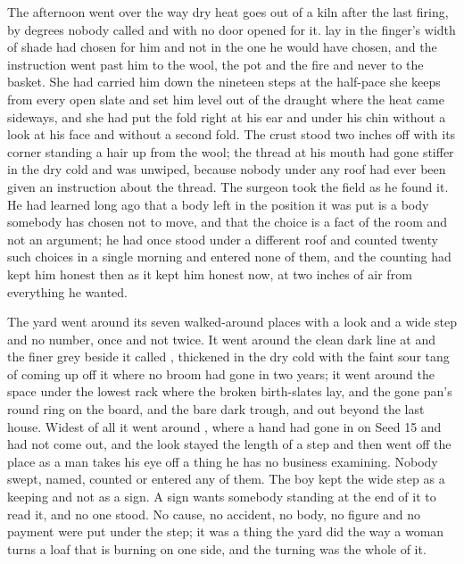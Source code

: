 The afternoon went over  the way dry heat goes out of a kiln after the last firing, by degrees nobody called and with no door opened for it.  lay in the finger's width of shade  had chosen for him and not in the one he would have chosen, and the instruction went past him to the wool, the pot and the fire and never to the basket. She had carried him down the nineteen steps at the half-pace she keeps from every open slate and set him level out of the draught where the heat came sideways, and she had put the fold right at his ear and under his chin without a look at his face and without a second fold. The crust stood two inches off with its corner standing a hair up from the wool; the thread at his mouth had gone stiffer in the dry cold and was unwiped, because nobody under any roof had ever been given an instruction about the thread. The surgeon took the field as he found it. He had learned long ago that a body left in the position it was put is a body somebody has chosen not to move, and that the choice is a fact of the room and not an argument; he had once stood under a different roof and counted twenty such choices in a single morning and entered none of them, and the counting had kept him honest then as it kept him honest now, at two inches of air from everything he wanted.

The yard went around its seven walked-around places with a look and a wide step and no number, once and not twice. It went around the clean dark line at  and the finer grey beside it called , thickened in the dry cold with the faint sour tang of  coming up off it where no broom had gone in two years; it went around the space under the lowest rack where the broken birth-slates lay, and the gone pan's round ring on the board, and the bare dark trough, and  out beyond the last house. Widest of all it went around , where a hand had gone in on Seed 15 and had not come out, and the look stayed the length of a step and then went off the place as a man takes his eye off a thing he has no business examining. Nobody swept, named, counted or entered any of them. The boy kept the wide step as a keeping and not as a sign. A sign wants somebody standing at the end of it to read it, and no one stood. No cause, no accident, no body, no figure and no payment were put under the step; it was a thing the yard did the way a woman turns a loaf that is burning on one side, and the turning was the whole of it.

